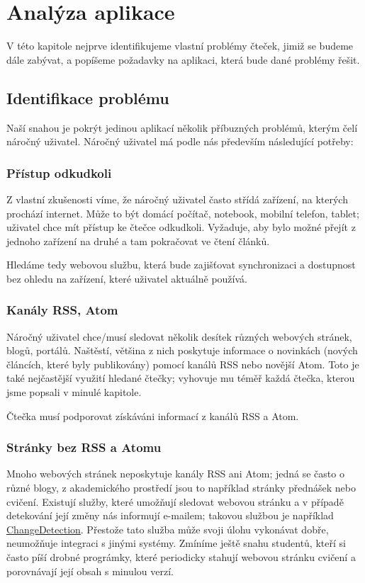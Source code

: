 \chapter{Analýza aplikace}

V této kapitole nejprve identifikujeme vlastní problémy čteček, jimiž se budeme dále zabývat, a popíšeme požadavky na aplikaci, která bude dané problémy řešit.

\section{Identifikace problému}

Naší snahou je pokrýt jedinou aplikací několik příbuzných problémů, kterým čelí náročný uživatel.
Náročný uživatel má podle nás především následující potřeby:

\subsection{Přístup odkudkoli}
Z vlastní zkušenosti víme, že náročný uživatel často střídá zařízení, na kterých prochází internet.
Může to být domácí počítač, notebook, mobilní telefon, tablet; uživatel chce mít přístup ke čtečce odkudkoli.
Vyžaduje, aby bylo možné přejít z jednoho zařízení na druhé a tam pokračovat ve čtení článků.

Hledáme tedy webovou službu, která bude zajišťovat synchronizaci a dostupnost bez ohledu na zařízení, které uživatel aktuálně používá.

\subsection{Kanály RSS, Atom}
Náročný uživatel chce/musí sledovat několik desítek různých webových stránek, blogů, portálů.
Naštěstí, většina z nich poskytuje informace o novinkách (nových článcích, které byly publikovány) pomocí kanálů RSS nebo novější Atom.
Toto je také nejčastější využití hledané čtečky; vyhovuje mu téměř každá čtečka, kterou jsme popsali v minulé kapitole.

Čtečka musí podporovat získáváni informací z kanálů RSS a Atom.

\subsection{Stránky bez RSS a Atomu}
Mnoho webových stránek neposkytuje kanály RSS ani Atom; jedná se často o různé blogy, z akademického prostředí jsou to například stránky přednášek nebo cvičení.
Existují služby, které umožňují sledovat webovou stránku a v případě detekování její změny nás informují e-mailem; takovou službou je například \href{http://www.changedetection.com/}{ChangeDetection}.
Přestože tato služba může svoji úlohu vykonávat dobře, neumožňuje integraci s jinými systémy.
Zmíníme ještě snahu studentů, kteří si často píší drobné prográmky, které periodicky stahují webovou stránku cvičení a porovnávají její obsah s minulou verzí.

